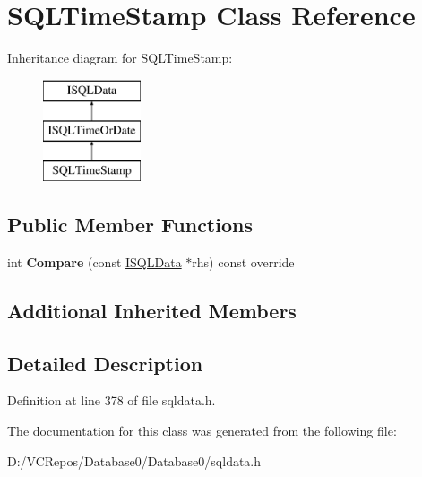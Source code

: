 \hypertarget{class_s_q_l_time_stamp}{}\section{S\+Q\+L\+Time\+Stamp Class Reference}
\label{class_s_q_l_time_stamp}
Inheritance diagram for S\+Q\+L\+Time\+Stamp\+:\begin{figure}[H]
\begin{center}
\leavevmode
\includegraphics[height=3.000000cm]{class_s_q_l_time_stamp}
\end{center}
\end{figure}
\subsection*{Public Member Functions}
\begin{DoxyCompactItemize}
\item 
\mbox{\label{class_s_q_l_time_stamp_a7acb3aa7f67e4760982a54afac7d47cb}} 
int {\bfseries Compare} (const \mbox{\hyperlink{class_i_s_q_l_data}{I\+S\+Q\+L\+Data}} $\ast$rhs) const override
\end{DoxyCompactItemize}
\subsection*{Additional Inherited Members}


\subsection{Detailed Description}


Definition at line 378 of file sqldata.\+h.



The documentation for this class was generated from the following file\+:\begin{DoxyCompactItemize}
\item 
D\+:/\+V\+C\+Repos/\+Database0/\+Database0/sqldata.\+h\end{DoxyCompactItemize}
